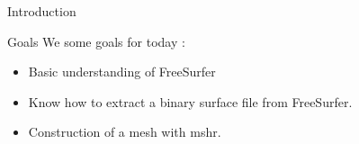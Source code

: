 \documentclass{beamer}
\begin{document}
%
%
%
%
\begin{frame}{Introduction}
\begin{block}{Goals}
We some goals for today :
\begin{itemize}
\item<2-> Basic understanding of FreeSurfer 
\item<3-> Know how to extract a binary surface file from FreeSurfer. 
\item<4-> Construction of a mesh with mshr.
\end{itemize}
\end{block}
\end{frame}

\end{document}
